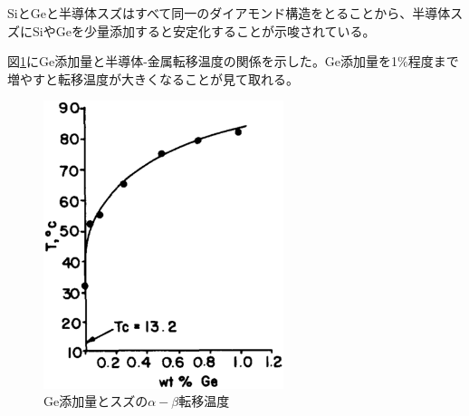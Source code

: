 SiとGeと半導体スズはすべて同一のダイアモンド構造をとることから、半導体スズにSiやGeを少量添加すると安定化することが示唆されている\cite{Ewald1954,Gallerneault1983}。

図\ref{fig:Ge_Stabilized_Sn}にGe添加量と半導体-金属転移温度の関係を示した\cite{Vnuk1984}。Ge添加量を1\%程度まで増やすと転移温度が大きくなることが見て取れる。
\begin{figure}[htb]
    \begin{center}
   \includegraphics[width=70mm]{Introduction/Ge_Stabilized_Sn.eps}
  \end{center}
  \caption{Ge添加量とスズの$\alpha-\beta$転移温度\cite{Vnuk1984}}
  \label{fig:Ge_Stabilized_Sn}
\end{figure}


